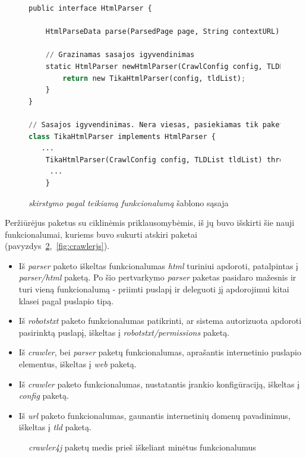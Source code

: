 \begin{figure}[H]
    \begin{lstlisting}[language=Python]
public interface HtmlParser {

    HtmlParseData parse(ParsedPage page, String contextURL) throws ParseException;

    // Grazinamas sasajos igyvendinimas
    static HtmlParser newHtmlParser(CrawlConfig config, TLDList tldList) throws InstantiationException, IllegalAccessException {
        return new TikaHtmlParser(config, tldList);
    }
}

// Sasajos igyvendinimas. Nera viesas, pasiekiamas tik paketo viduje, nes klase ir konstruktorius nenaudoja public raktazodziu
class TikaHtmlParser implements HtmlParser {
   ...
    TikaHtmlParser(CrawlConfig config, TLDList tldList) throws InstantiationException, IllegalAccessException {
     ...
    }
    \end{lstlisting}
    \caption{\textit{skirstymo pagal teikiamą funkcionalumą} šablono sąsaja}
    \label{fig:sasaja}
\end{figure}
Peržiūrėjus paketus su ciklinėmis priklausomybėmis, iš jų buvo išskirti šie nauji funkcionalumai, kuriems
buvo sukurti atskiri paketai (pavyzdys~\ref{fig:crawlerj},~\ref{fig:crawlerjs}).
\begin{itemize}
    \item Iš \textit{parser} paketo iškeltas funkcionalumas \textit{html} turiniui apdoroti, patalpintas į \textit{parser/html} paketą.
    Po šio pertvarkymo \textit{parser} paketas pasidaro mažesnis ir turi vieną funkcionalumą - priimti puslapį ir deleguoti jį apdorojimui kitai klasei pagal puslapio tipą.
    \item Iš \textit{robotstxt} paketo funkcionalumas patikrinti, ar sistema autorizuota apdoroti pasirinktą puslapį, iškeltas į \textit{robotstxt/permissions} paketą.
    \item Iš \textit{crawler}, bei \textit{parser} paketų funkcionalumas, aprašantis internetinio puslapio elementus, iškeltas į \textit{web} paketą.
    \item Iš \textit{crawler} paketo funkcionalumas, nustatantis įrankio konfigūraciją, iškeltas į \textit{config} paketą.
    \item Iš \textit{url} paketo funkcionalumas, gaunantis internetinių domenų pavadinimus, iškeltas į \textit{tld} paketą.
\end{itemize}

\begin{figure}[H]
    \snugshade
    \endsnugshade
    \caption{\textit{crawler4j} paketų medis prieš iškeliant minėtus funkcionalumus}
    \label{fig:crawlerj}
\end{figure}

